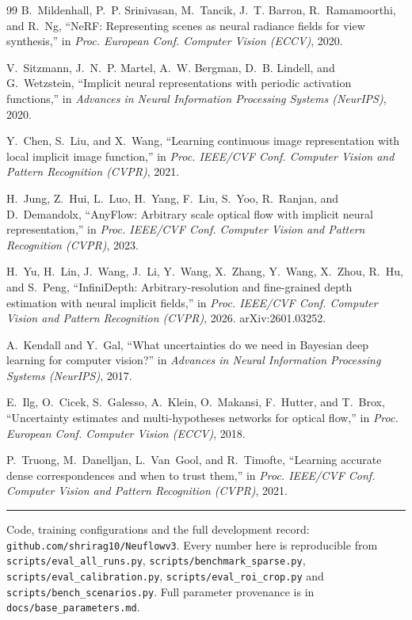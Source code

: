\documentclass[11pt,a4paper]{article}
\begin{document}
\begin{thebibliography}{99}
B.~Mildenhall, P.~P. Srinivasan, M.~Tancik, J.~T. Barron, R.~Ramamoorthi, and
R.~Ng, ``NeRF: Representing scenes as neural radiance fields for view
synthesis,'' in \emph{Proc. European Conf. Computer Vision (ECCV)}, 2020.

V.~Sitzmann, J.~N.~P. Martel, A.~W. Bergman, D.~B. Lindell, and G.~Wetzstein,
``Implicit neural representations with periodic activation functions,'' in
\emph{Advances in Neural Information Processing Systems (NeurIPS)}, 2020.

Y.~Chen, S.~Liu, and X.~Wang, ``Learning continuous image representation with
local implicit image function,'' in \emph{Proc. IEEE/CVF Conf. Computer Vision
and Pattern Recognition (CVPR)}, 2021.

H.~Jung, Z.~Hui, L.~Luo, H.~Yang, F.~Liu, S.~Yoo, R.~Ranjan, and D.~Demandolx,
``AnyFlow: Arbitrary scale optical flow with implicit neural representation,'' in
\emph{Proc. IEEE/CVF Conf. Computer Vision and Pattern Recognition (CVPR)}, 2023.

H.~Yu, H.~Lin, J.~Wang, J.~Li, Y.~Wang, X.~Zhang, Y.~Wang, X.~Zhou, R.~Hu, and
S.~Peng, ``InfiniDepth: Arbitrary-resolution and fine-grained depth estimation
with neural implicit fields,'' in \emph{Proc. IEEE/CVF Conf. Computer Vision and
Pattern Recognition (CVPR)}, 2026. arXiv:2601.03252.

A.~Kendall and Y.~Gal, ``What uncertainties do we need in Bayesian deep learning
for computer vision?'' in \emph{Advances in Neural Information Processing Systems
(NeurIPS)}, 2017.

E.~Ilg, O.~Cicek, S.~Galesso, A.~Klein, O.~Makansi, F.~Hutter, and T.~Brox,
``Uncertainty estimates and multi-hypotheses networks for optical flow,'' in
\emph{Proc. European Conf. Computer Vision (ECCV)}, 2018.

P.~Truong, M.~Danelljan, L.~Van~Gool, and R.~Timofte, ``Learning accurate dense
correspondences and when to trust them,'' in \emph{Proc. IEEE/CVF Conf. Computer
Vision and Pattern Recognition (CVPR)}, 2021.

\end{thebibliography}
\endgroup

\vspace{6pt}
{\color{rule}\hrule}
\vspace{4pt}
{\footnotesize\color{muted}\raggedright
Code, training configurations and the full development record:
\texttt{github.com/shrirag10/Neuflowv3}. Every number here is reproducible from
\texttt{scripts/eval\_all\_runs.py}, \texttt{scripts/benchmark\_sparse.py},
\texttt{scripts/eval\_calibration.py}, \texttt{scripts/eval\_roi\_crop.py} and
\texttt{scripts/bench\_scenarios.py}. Full parameter provenance is in
\texttt{docs/base\_parameters.md}.\par}
\end{document}
